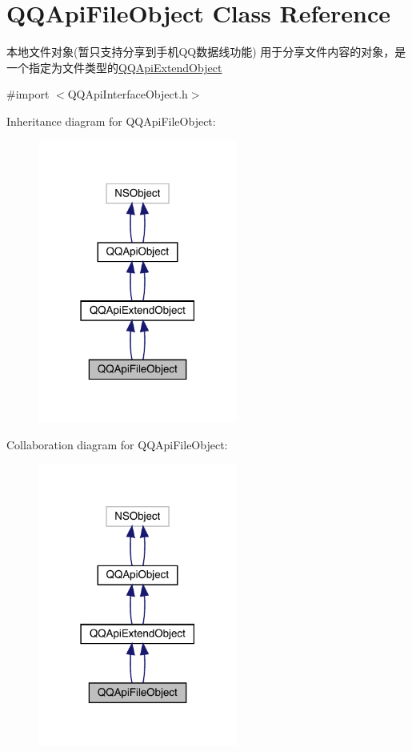 \hypertarget{interface_q_q_api_file_object}{}\section{Q\+Q\+Api\+File\+Object Class Reference}
\label{interface_q_q_api_file_object}


本地文件对象(暂只支持分享到手机\+Q\+Q数据线功能) 用于分享文件内容的对象，是一个指定为文件类型的{\ttfamily \mbox{\hyperlink{interface_q_q_api_extend_object}{Q\+Q\+Api\+Extend\+Object}}}  




{\ttfamily \#import $<$Q\+Q\+Api\+Interface\+Object.\+h$>$}



Inheritance diagram for Q\+Q\+Api\+File\+Object\+:\nopagebreak
\begin{figure}[H]
\begin{center}
\leavevmode
\includegraphics[width=186pt]{interface_q_q_api_file_object__inherit__graph}
\end{center}
\end{figure}


Collaboration diagram for Q\+Q\+Api\+File\+Object\+:\nopagebreak
\begin{figure}[H]
\begin{center}
\leavevmode
\includegraphics[width=186pt]{interface_q_q_api_file_object__coll__graph}
\end{center}
\end{figure}
